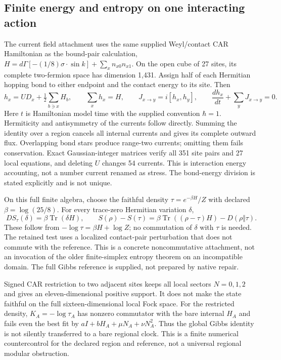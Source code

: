 \subsection{Finite energy and entropy on one interacting action}
\label{subsec:finite-field-stress-entropy}

The current field attachment uses the same supplied Weyl/contact CAR
Hamiltonian as the bound-pair calculation,
$H=d\Gamma[-(1/8)\sigma\cdot\sin k]+\sum_x n_{x0}n_{x1}$.
On the open cube of 27 sites, its complete two-fermion space has dimension
1,431. Assign half of each Hermitian hopping bond to either endpoint and
the contact energy to its site. Then
\[
 h_x=UD_x+\tfrac12\sum_{b\ni x}H_b,\qquad
 \sum_xh_x=H,\qquad J_{x\to y}=i[h_x,h_y],\qquad
 \frac{dh_x}{dt}+\sum_yJ_{x\to y}=0.
\]
Here $t$ is Hamiltonian model time with the supplied convention $\hbar=1$.
Hermiticity and antisymmetry of the currents follow directly. Summing the
identity over a region cancels all internal currents and gives its complete
outward flux. Overlapping bond stars produce range-two currents; omitting
them fails conservation. Exact Gaussian-integer matrices verify all 351
site pairs and 27 local equations, and deleting $U$ changes 54 currents.
This is interaction energy accounting, not a number current renamed as
stress. The bond-energy division is stated explicitly and is not unique.

On this full finite algebra, choose the faithful density
$\tau=e^{-\beta H}/Z$ with declared $\beta=\log(25/8)$. For every
trace-zero Hermitian variation $\delta$,
\[
 DS_\tau(\delta)=\beta\operatorname{Tr}(\delta H),\qquad
 S(\rho)-S(\tau)=\beta\operatorname{Tr}((\rho-\tau)H)
                       -D(\rho\Vert\tau).
\]
These follow from $-\log\tau=\beta H+\log Z$; no commutation of
$\delta$ with $\tau$ is needed. The retained test uses a localized
contact-pair perturbation that does not commute with the reference.
This is a concrete noncommutative attachment, not an invocation of the
older finite-simplex entropy theorem on an incompatible domain. The full
Gibbs reference is supplied, not prepared by native repair.

Signed CAR restriction to two adjacent sites keeps all local sectors
$N=0,1,2$ and gives an eleven-dimensional positive support. It does not
make the state faithful on the full sixteen-dimensional local Fock space.
For the restricted density, $K_A=-\log\tau_A$ has nonzero commutator
with the bare internal $H_A$ and fails even the best fit by
$aI+bH_A+\mu N_A+\nu N_A^2$. Thus the global Gibbs identity is not
silently transferred to a bare regional clock. This is a finite numerical
countercontrol for the declared region and reference, not a universal
regional modular obstruction.

